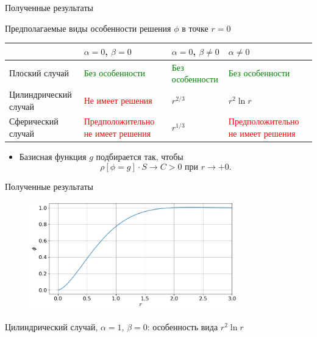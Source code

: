 \begin{frame}{Полученные результаты}
\vspace{-0.3cm}
\begin{center}
	Предполагаемые виды особенности решения $\phi$ в точке $r = 0$
\end{center}
\begin{tabular}{|m{3cm}||m{3.5cm}|m{3.5cm}|m{3.5cm}|}
	\hline
	\vspace*{2mm} \hfill \vspace*{2mm} &\centering $\alpha = 0$, $\beta = 0$ &
	\centering $\alpha = 0$, $\beta \neq 0$ & \centering \arraybackslash $\alpha \neq 0$ \\
	\hline
	\hline
	\vspace{2mm} Плоский \linebreak случай \vspace{2mm} &
	\textcolor{green}{Без особенности} & \textcolor{green}{Без особенности} & \textcolor{green}{Без особенности} \\
	\hline
	\vspace{2mm} Цилиндрический \linebreak случай \vspace{2mm} &
	\textcolor{red}{Не имеет решения} & $r^{2/3}$ & $r^2 \ln r$ \\
	\hline
	\vspace{2mm} Сферический \linebreak случай \vspace{2mm} &
	\textcolor{red}{Предположительно не имеет решения} & $r^{1/3}$ & \textcolor{red}{Предположительно не имеет решения} \\
	\hline
\end{tabular}
\begin{itemize}
	\item Базисная функция $g$ подбирается так, чтобы
	\vspace{-0.2cm}
	$$\rho[\phi = g] \cdot S \to C > 0 \text{ при } r \to +0.$$
\end{itemize}
\end{frame}


\begin{frame}{Полученные результаты}
\vspace{-0.5cm}
\begin{figure}
	\includegraphics[width=0.81\textwidth]{figures/result_volumes_cyl_bi.png}
\end{figure}
\vspace{-0.7cm}
\begin{center}
	Цилиндрический случай, $\alpha = 1$, $\beta = 0$: особенность вида $r^2 \ln r$
\end{center}
\end{frame}



